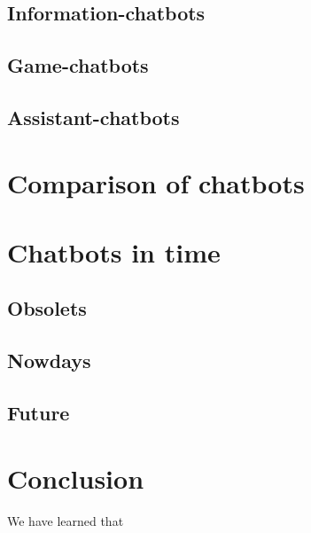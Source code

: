 \documentclass[12pt,twoside]{article}
\theoremstyle{plain}
\theoremstyle{definition}
\theoremstyle{remark}
\begin{document}
	

	\subsection{Information-chatbots}
	\label{sec:information}

	\subsection{Game-chatbots}
	\label{sec:game}

	\subsection{Assistant-chatbots}
	\label{sec:assistant}
	

\section{Comparison of chatbots}
\label{sec:comparison}


\section{Chatbots in time}
\label{sec:time}

\subsection{Obsolets}
\label{sec:obsolet}

\subsection{Nowdays}
\label{sec:nowdays}

\subsection{Future}
\label{sec:future}

\section{Conclusion}
\label{sec:conclusion}

We have learned that

%
%
\nocite{*}


\newpage


\end{document}
